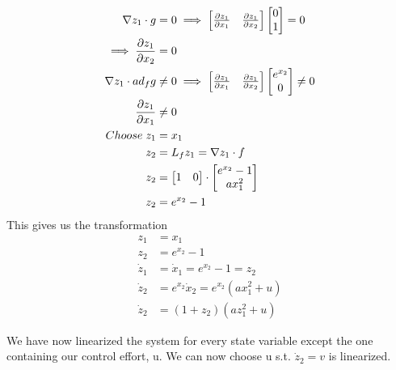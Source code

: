 \documentclass{article}
\begin{document}
  \begin{align*}
    \nabla z_1 \cdot g &= 0 \implies
    \begin{bmatrix}
       \frac{\partial z_1}{\partial x_1} & \frac{\partial z_1}{\partial x_2}                                           
    \end{bmatrix}
    \begin{bmatrix}
      0 \\
      1
    \end{bmatrix} = 0 \\
    \implies \frac{\partial z_1}{\partial x_2} &= 0 \\
    \nabla z_1 \cdot ad_fg &\neq 0 \implies
    \begin{bmatrix}
       \frac{\partial z_1}{\partial x_1} & \frac{\partial z_1}{\partial x_2}                                           
    \end{bmatrix}
    \begin{bmatrix}
      e^{x_2} \\
      0
    \end{bmatrix} \neq 0 \\
    \frac{\partial z_1}{\partial x_1} &\neq 0 \\
    Choose \hspace{1mm} z_1 &= x_1 \\
    z_2 &= L_fz_1 = \nabla z_1 \cdot f \\
    z_2 &= \begin{bmatrix}
             1 & 0
           \end{bmatrix} \cdot
           \begin{bmatrix}
             e^{x_2}-1 \\
             ax_1^2
           \end{bmatrix} \\
    z_2 &= e^{x_2} - 1
  \end{align*}
  This gives us the transformation
  \begin{align*}
    z_1 &= x_1 \\
    z_2 &= e^{x_2} - 1 \\
    \dot{z}_1 &= \dot{x}_1 = e^{x_2} - 1 = z_2 \\
    \dot{z}_2 &= e^{x_2}\dot{x}_2 = e^{x_2}(ax_1^2+u) \\
    \dot{z}_2 &= (1+z_2) (az_1^2+u) 
  \end{align*}

  We have now linearized the system for every state variable except the one
  containing our control effort, u. We can now choose u s.t. $\dot{z}_2 = v$ is
  linearized.
\end{document}

